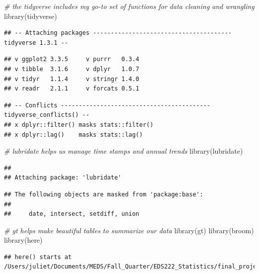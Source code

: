 \documentclass[
]{article}
\newenvironment{Shaded}{\begin{snugshade}}{\end{snugshade}}
\newcommand{\CommentTok}[1]{\textcolor[rgb]{0.56,0.35,0.01}{\textit{#1}}}
\newcommand{\FunctionTok}[1]{\textcolor[rgb]{0.00,0.00,0.00}{#1}}
\newcommand{\NormalTok}[1]{#1}
\begin{document}
\begin{Shaded}
\begin{Highlighting}[]
\CommentTok{\# the tidyverse includes my go{-}to set of functions for data cleaning and wrangling}
\FunctionTok{library}\NormalTok{(tidyverse)}
\end{Highlighting}
\end{Shaded}

\begin{verbatim}
## -- Attaching packages --------------------------------------- tidyverse 1.3.1 --
\end{verbatim}

\begin{verbatim}
## v ggplot2 3.3.5     v purrr   0.3.4
## v tibble  3.1.6     v dplyr   1.0.7
## v tidyr   1.1.4     v stringr 1.4.0
## v readr   2.1.1     v forcats 0.5.1
\end{verbatim}

\begin{verbatim}
## -- Conflicts ------------------------------------------ tidyverse_conflicts() --
## x dplyr::filter() masks stats::filter()
## x dplyr::lag()    masks stats::lag()
\end{verbatim}

\begin{Shaded}
\begin{Highlighting}[]
\CommentTok{\# lubridate helps us manage time stamps and annual trends}
\FunctionTok{library}\NormalTok{(lubridate)}
\end{Highlighting}
\end{Shaded}

\begin{verbatim}
## 
## Attaching package: 'lubridate'
\end{verbatim}

\begin{verbatim}
## The following objects are masked from 'package:base':
## 
##     date, intersect, setdiff, union
\end{verbatim}

\begin{Shaded}
\begin{Highlighting}[]
\CommentTok{\# gt helps make beautiful tables to summarize our data}
\FunctionTok{library}\NormalTok{(gt)}
\FunctionTok{library}\NormalTok{(broom)}
\FunctionTok{library}\NormalTok{(here)}
\end{Highlighting}
\end{Shaded}

\begin{verbatim}
## here() starts at /Users/juliet/Documents/MEDS/Fall_Quarter/EDS222_Statistics/final_project/fishing_effort
\end{verbatim}
\end{document}
